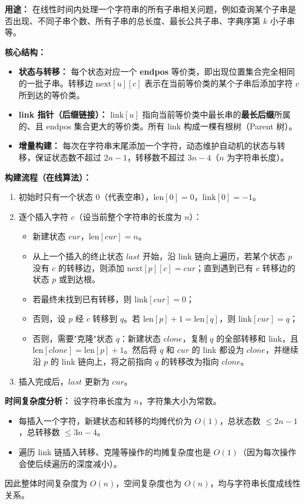\textbf{用途：} 在线性时间内处理一个字符串的所有子串相关问题，例如查询某个子串是否出现、不同子串个数、所有子串的总长度、最长公共子串、字典序第 $k$ 小子串等。

\textbf{核心结构：}
\begin{itemize}
  \item \textbf{状态与转移：} 每个状态对应一个 \textbf{endpos} 等价类，即出现位置集合完全相同的一批子串。转移边 $\text{next}[u][c]$ 表示在当前等价类的某个子串后添加字符 $c$ 所到达的等价类。
  \item \textbf{link 指针（后缀链接）：} $\text{link}[u]$ 指向当前等价类中最长串的\textbf{最长后缀}所属的、且 endpos 集合更大的等价类。所有 link 构成一棵有根树（Parent 树）。
  \item \textbf{增量构建：} 每次在字符串末尾添加一个字符，动态维护自动机的状态与转移，保证状态数不超过 $2n-1$，转移数不超过 $3n-4$（$n$ 为字符串长度）。
\end{itemize}

\textbf{构建流程（在线算法）：}
\begin{enumerate}
  \item 初始时只有一个状态 $0$（代表空串），$\text{len}[0]=0$，$\text{link}[0]=-1$。
  \item 逐个插入字符 $c$（设当前整个字符串的长度为 $n$）：
    \begin{itemize}
      \item 新建状态 $cur$，$\text{len}[cur] = n$。
      \item 从上一个插入的终止状态 $last$ 开始，沿 link 链向上遍历，若某个状态 $p$ 没有 $c$ 的转移边，则添加 $\text{next}[p][c] = cur$；直到遇到已有 $c$ 转移边的状态 $p$ 或到达根。
      \item 若最终未找到已有转移，则 $\text{link}[cur] = 0$；
      \item 否则，设 $p$ 经 $c$ 转移到 $q$。若 $\text{len}[p] + 1 = \text{len}[q]$，则 $\text{link}[cur] = q$；
      \item 否则，需要"克隆"状态 $q$：新建状态 $clone$，复制 $q$ 的全部转移和 link，且 $\text{len}[clone] = \text{len}[p] + 1$。然后将 $q$ 和 $cur$ 的 link 都设为 $clone$，并继续沿 $p$ 的 link 链向上，将之前指向 $q$ 的转移改为指向 $clone$。
    \end{itemize}
  \item 插入完成后，$last$ 更新为 $cur$。
\end{enumerate}

\textbf{时间复杂度分析：}
设字符串长度为 $n$，字符集大小为常数。
\begin{itemize}
  \item 每插入一个字符，新建状态和转移的均摊代价为 $O(1)$，总状态数 $\leq 2n-1$，总转移数 $\leq 3n-4$。
  \item 遍历 link 链插入转移、克隆等操作的均摊复杂度也是 $O(1)$（因为每次操作会使后续遍历的深度减小）。
\end{itemize}
因此整体时间复杂度为 $O(n)$，空间复杂度也为 $O(n)$，均与字符串长度成线性关系。

